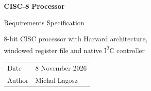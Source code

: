 \documentclass[11pt,a4paper]{article}
\newcommand{\DocTitle}{CISC-8 Processor}
\newcommand{\DocSubtitle}{Requirements Specification}
\newcommand{\DocDate}{8 November 2026}
\newcommand{\DocAuthor}{Michal Lagosz}
\newcommand{\IIC}{I\textsuperscript{2}C}
\begin{document}
\begin{titlepage}
  \centering
  \vspace*{3cm}
  {\Huge\bfseries \DocTitle\par}
  \vspace{0.6cm}
  {\LARGE \DocSubtitle\par}
  \vspace{0.4cm}
  {\large 8-bit CISC processor with Harvard architecture,\\
   windowed register file and native \IIC{} controller\par}
  \vspace{2.5cm}
  \begin{tabular}{@{}ll@{}}
    \toprule
    Date            & \DocDate \\
    Author          & \DocAuthor \\
    \bottomrule
  \end{tabular}
\end{titlepage}

\tableofcontents
\listoffigures
\newpage









\end{document}
